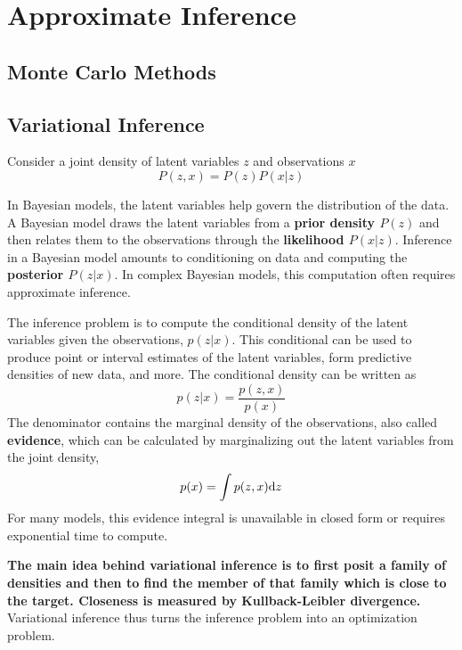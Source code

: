 \chapter{Approximate Inference}

\section{Monte Carlo Methods}

\section{Variational Inference}

Consider a joint density of latent variables $z$ and observations $x$
\begin{equation}
    P(z, x) = P(z)P(x|z)
\end{equation}

In Bayesian models, the latent variables help govern the distribution of the data. A Bayesian
model draws the latent variables from a \textbf{prior density $P(z)$} and then relates them to the
observations through the \textbf{likelihood $P(x|z)$}. Inference in a Bayesian model amounts to
conditioning on data and computing the \textbf{posterior $P(z|x)$}. In complex Bayesian models,
this computation often requires approximate inference.

The inference problem is to compute the conditional density of the latent variables given the observations, $p(z|x)$. This conditional
can be used to produce point or interval estimates of the latent variables, form predictive densities of new data, and more. The conditional
density can be written as
\begin{equation}
    p(z|x) = \frac{p(z, x)}{p(x)}
\end{equation}
The denominator contains the marginal density of the observations, also called \textbf{evidence}, which can be calculated by marginalizing out
the latent variables from the joint density,
\begin{equation}
    p(x) = \int p(z, x) \mathrm{d} z
\end{equation}
For many models, this evidence integral is unavailable in closed form or requires exponential
time to compute.

\textbf{The main idea behind variational inference is to first posit a family of densities and then to find the member of that family which is close to
the target. Closeness is measured by Kullback-Leibler divergence.} Variational inference thus turns the
inference problem into an optimization problem.

